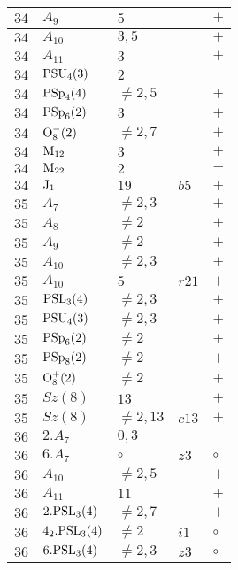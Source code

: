 \documentclass[a4paper, 11pt]{article}
\begin{document}
\begin{longtable}{lllll}
		$34$ & $A_{9}$ & $5$ & & $+$ \\ \hline
		$34$ & $A_{10}$ & $3,5$ & & $+$ \\ \hline
		$34$ & $A_{11}$ & $3$ & & $+$ \\ \hline
		$34$ & ${\rm PSU}_{4}(3)$ & $2$ & & $-$ \\ \hline
		$34$ & ${\rm PSp}_{4}(4)$ & $\neq 2,5$ & & $+$ \\ \hline
		$34$ & ${\rm PSp}_{6}(2)$ & $3$ & & $+$ \\ \hline
		$34$ & ${\rm O}_{8}^-(2)$ & $\neq 2,7$ & & $+$ \\ \hline
		$34$ & ${\rm M}_{12}$ & $3$ & & $+$ \\ \hline
		$34$ & ${\rm M}_{22}$ & $2$ & & $-$ \\ \hline
		$34$ & ${\rm J}_1$ & $19$ & $b5$ & $+$ \\ \hline
		$35$ & $A_{7}$ & $\neq 2,3$ & & $+$ \\ \hline
		$35$ & $A_{8}$ & $\neq 2$ & & $+$ \\ \hline
		$35$ & $A_{9}$ & $\neq 2$ & & $+$ \\ \hline
		$35$ & $A_{10}$ & $\neq 2,3$ & & $+$ \\ \hline
		$35$ & $A_{10}$ & $5$ & $r21$ & $+$ \\ \hline
		$35$ & ${\rm PSL}_{3}(4)$ & $\neq 2,3$ & & $+$ \\ \hline
		$35$ & ${\rm PSU}_{4}(3)$ & $\neq 2,3$ & & $+$ \\ \hline
		$35$ & ${\rm PSp}_{6}(2)$ & $\neq 2$ & & $+$ \\ \hline
		$35$ & ${\rm PSp}_{8}(2)$ & $\neq 2$ & & $+$ \\ \hline
		$35$ & ${\rm O}_{8}^+(2)$ & $\neq 2$ & & $+$ \\ \hline
		$35$ & $Sz(8)$ & $13$ & & $+$ \\ \hline
		$35$ & $Sz(8)$ & $\neq 2,13$ & $c13$ & $+$ \\ \hline
		$36$ & $2.A_{7}$ & $0,3$ & & $-$ \\ \hline
		$36$ & $6.A_{7}$ & $\circ$ & $z3$ & $\circ$ \\ \hline
		$36$ & $A_{10}$ & $\neq 2,5$ & & $+$ \\ \hline
		$36$ & $A_{11}$ & $11$ & & $+$ \\ \hline
		$36$ & $2.{\rm PSL}_{3}(4)$ & $\neq 2,7$ & & $+$ \\ \hline
		$36$ & $4_2.{\rm PSL}_{3}(4)$ & $\neq 2$ & $i1$ & $\circ$ \\ \hline
		$36$ & $6.{\rm PSL}_{3}(4)$ & $\neq 2,3$ & $z3$ & $\circ$ \\ \hline

\end{longtable}
\end{document}

